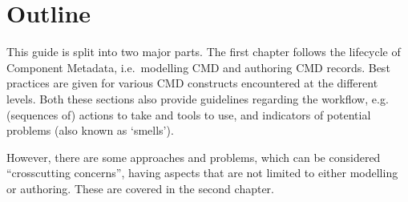 \section{Outline}\label{outline}

This guide is split into two major parts. The first chapter follows the lifecycle of Component Metadata, i.e.~modelling CMD and authoring CMD records. Best practices are given for various CMD constructs encountered at the different levels. Both these sections also provide guidelines regarding the workflow, e.g. (sequences of) actions to take and tools to use, and indicators of potential problems (also known as `smells').

However, there are some approaches and problems, which can be considered ``crosscutting concerns'', having aspects that are not limited to either modelling or authoring. These are covered in the second chapter.
